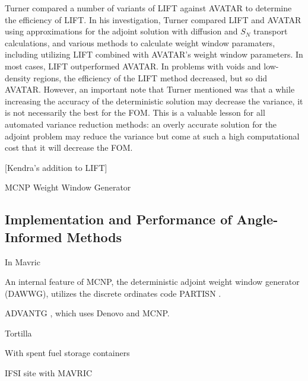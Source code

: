 Turner compared a number of variants of LIFT \cite{turner_automatic_1997-1}
against AVATAR to
determine the efficiency of LIFT. In his investigation, Turner compared LIFT and
AVATAR using
approximations for the adjoint solution with diffusion and $S_N$ transport
calculations, and
various methods to calculate weight window paramaters, including utilizing LIFT
combined
with AVATAR's weight window parameters. In most cases, LIFT outperformed AVATAR.
In problems
with voids and low-density regions, the efficiency of the LIFT method decreased,
but so did
AVATAR. However, an important note that Turner mentioned was that a while
increasing the
accuracy of the deterministic solution may decrease the variance, it is not
necessarily the
best for the FOM. This is a valuable lesson for all automated variance reduction
methods: an
overly accurate solution for the adjoint problem may reduce the variance but
come at such
a high computational cost that it will decrease the FOM.

[Kendra's addition to LIFT]

MCNP Weight Window Generator \cite{mcnp_manual_v1}



\subsection{Implementation and Performance of Angle-Informed Methods}
\label{sec:resultsangle}

In Mavric \cite{SCALE6_2} \cite{peplow_advanced_2007}

An internal feature of MCNP, the deterministic adjoint weight window generator
(DAWWG), utilizes the discrete ordinates code PARTISN
\cite{sweezy_automated_2005}.

ADVANTG \cite{mosher_new_2010, wagner_review_2011, bevill_new_2012}, which uses
Denovo \cite{evans_denovo:_2010-1} and MCNP.

Tortilla \cite{somasundaram_implementation_2013}

With spent fuel storage containers \cite{chen_surface_2011}

IFSI site with MAVRIC \cite{sheu_dose_2011}



